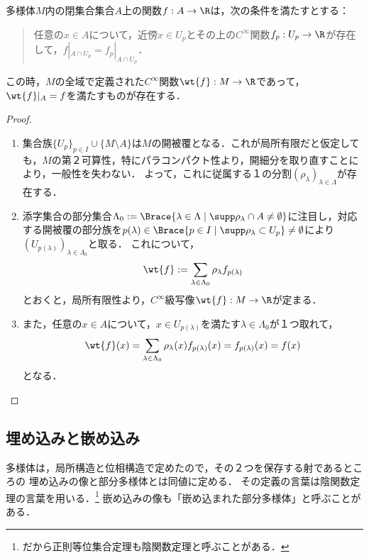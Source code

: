 \documentclass[uplatex,dvipdfmx]{jsreport}
\begin{document}
\begin{problem}
    多様体$M$内の閉集合集合$A$上の関数$f:A\to\R$は，次の条件を満たすとする：
    \begin{quote}
        任意の$x\in A$について，近傍$x\in U_p$とその上の$C^\infty$関数$f_p:U_p\to\R$が存在して，$f|_{A\cap U_p}=f_p|_{A\cap U_p}$．
    \end{quote}
    この時，$M$の全域で定義された$C^\infty$関数$\wt{f}:M\to\R$であって，$\wt{f}|_A=f$を満たすものが存在する．
\end{problem}
\begin{proof}\mbox{}
    \begin{enumerate}
        \item 集合族$\{U_p\}_{p\in I}\cup\{M\setminus A\}$は$M$の開被覆となる．これが局所有限だと仮定しても，$M$の第２可算性，特にパラコンパクト性より，開細分を取り直すことにより，一般性を失わない．
        よって，これに従属する１の分割$(\rho_\lambda)_{\lambda\in\Lambda}$が存在する．
        \item 添字集合の部分集合$\Lambda_0:=\Brace{\lambda\in\Lambda\mid\supp\rho_\lambda\cap A\ne\emptyset}$に注目し，対応する開被覆の部分族を$p(\lambda)\in\Brace{p\in I\mid\supp\rho_\lambda\subset U_p}\ne\emptyset$により$(U_{p(\lambda)})_{\lambda\in\Lambda_0}$と取る．
        これについて，
        \[\wt{f}:=\sum_{\lambda\in\Lambda_0}\rho_\lambda f_{p(\lambda)}\]
        とおくと，局所有限性より，$C^\infty$級写像$\wt{f}:M\to\R$が定まる．
        \item また，任意の$x\in A$について，$x\in U_{p(\lambda)}$を満たす$\lambda\in\Lambda_0$が１つ取れて，
        \[\wt{f}(x)=\sum_{\lambda\in\Lambda_0}\rho_\lambda(x) f_{p(\lambda)}(x)=f_{p(\lambda)}(x)=f(x)\]
        となる．
    \end{enumerate}
\end{proof}

\subsection{埋め込みと嵌め込み}

\begin{tcolorbox}[colframe=ForestGreen, colback=ForestGreen!10!white,breakable,colbacktitle=ForestGreen!40!white,coltitle=black,fonttitle=\bfseries\sffamily,
title=]
    多様体は，局所構造と位相構造で定めたので，その２つを保存する射であるところの
    埋め込みの像と部分多様体とは同値に定める．
    その定義の言葉は陰関数定理の言葉を用いる．\footnote{だから正則等位集合定理も陰関数定理と呼ぶことがある．}
    嵌め込みの像も「嵌め込まれた部分多様体」と呼ぶことがある．
\end{tcolorbox}
\end{document}
